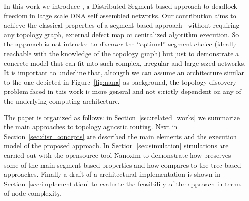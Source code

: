In this work we introduce \disr{}, a Distributed Segment-based approach
to deadlock freedom in large scale DNA self assembled networks. Our
contribution aims to achieve the classical properties of a
segment-based approach~\cite{mejia_ipdps06} without requiring any
topology graph, external defect map or centralized algorithm
execution.  So the \disr{} approach is not intended to discover the
``optimal'' segment choice (ideally reachable with the knowledge of
the topology graph) but just to demonstrate a concrete model that can
fit into such complex, irregular and large sized networks.
It is important to
underline that, altougth we can assume an architecture similar to the
one depicted in Figure~\ref{fig:nana} as background, the topology discovery
problem faced in this work is more general and not strictly dependent on any of the
underlying computing architecture.

The paper is organized as follows: in Section~\ref{sec:related_works}
we summarize the main approaches to topology agnostic routing. Next in
Section~\ref{sec:disr_concepts} are described the main elements and
the execution model of the proposed approach.  In Section~\ref{sec:simulation}
simulations are carried out with the opensource tool Nanoxim to
demonstrate how \disr{} preserves some of the main segment-based
properties and how compares to the tree-based approaches. Finally a
draft of a architectural implementation is shown in
Section~\ref{sec:implementation} to evaluate the feasibility of the
approach in terms of node complexity.

